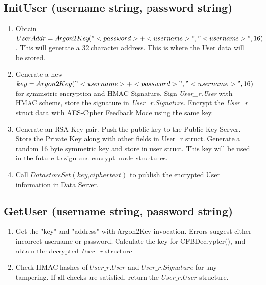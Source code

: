 \documentclass[a4paper, 12pt]{scrartcl}
\begin{document}
\subsection{InitUser (username string, password string)}
\begin{enumerate}
	\itemsep0em

    \item Obtain $UserAddr = Argon2Key("<password>+<username>", "<username>", 16)$. This will generate a 32 character address. This is where the User data will be stored.
    \item Generate a new $key = Argon2Key("<username>+<password>", "<username>", 16)$ for symmetric encryption and HMAC Signature. Sign \textit{User\_r.User} with HMAC scheme, store the signature in \textit{User\_r.Signature}. Encrypt the \textit{User\_r} struct data with AES-Cipher Feedback Mode using the same key.
	\item Generate an RSA Key-pair. Push the public key to the Public Key Server. Store the Private Key along with other fields in User\_r struct. Generate a random 16 byte symmetric key and store in user struct. This key will be used in the future to sign and encrypt inode structures.
	\item Call $DatastoreSet(key, ciphertext)$ to publish the encrypted User information in Data Server.
\end{enumerate}

\subsection{GetUser (username string, password string)}
\begin{enumerate}
	\itemsep0em

	\item Get the "key" and "address" with Argon2Key invocation. Errors suggest either incorrect username or password. Calculate the key for CFBDecrypter(), and obtain the decrypted \textit{User\_r} structure.
	\item Check HMAC hashes of $User\_r.User$ and $User\_r.Signature$ for any tampering. If all checks are satisfied, return the $User\_r.User$ structure.
\end{enumerate}
\end{document}
